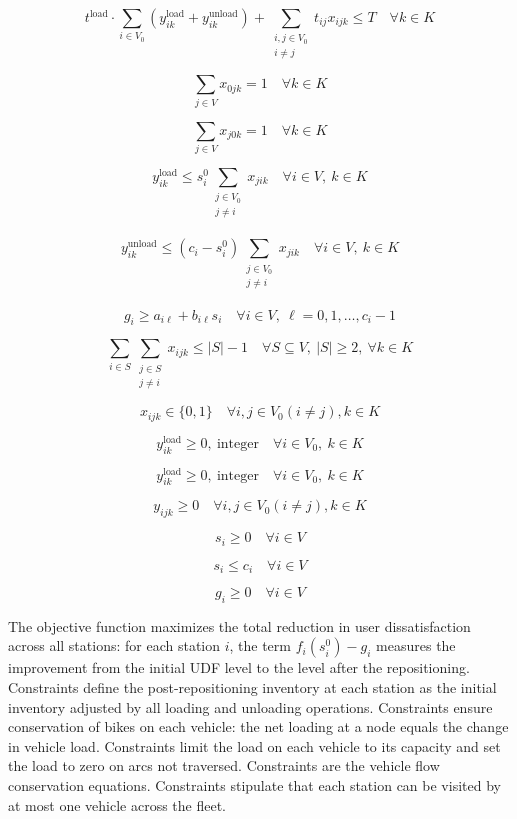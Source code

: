 \documentclass[11pt]{article}
\numberwithin{table}{section}
\numberwithin{figure}{section}
\begin{document}
\[
{{t}^{\text{load}}}\cdot \sum\limits_{i\in {{V}_{0}}}{(y_{ik}^{\text{load}}+y_{ik}^{\text{unload}})}+\sum\limits_{\begin{smallmatrix}
i,j\in {{V}_{0}} \\
i\ne j
\end{smallmatrix}}{{{t}_{ij}}}{{x}_{ijk}}\le T\quad \forall k\in K
\]

\[
\sum\limits_{j\in V}{{{x}_{0jk}}}=1\quad \forall k\in K
\]

\[
\sum\limits_{j\in V}{{{x}_{j0k}}}=1\quad \forall k\in K
\]

\[
y_{ik}^{\text{load}}\le s_{i}^{0}{{\sum }_{\begin{matrix}
j\in {{V}_{0}}  \\
j\ne i  \\
\end{matrix}}}{{x}_{jik}}\quad \forall i\in V,\ k\in K
\]

\[
y_{ik}^{\text{unload}}\le ({{c}_{i}}-s_{i}^{0}){{\sum }_{\begin{matrix}
j\in {{V}_{0}}  \\
j\ne i  \\
\end{matrix}}}{{x}_{jik}}\quad \forall i\in V,\ k\in K
\]

\[
{{g}_{i}}\ge {{a}_{i\ell }}+{{b}_{i\ell }}{{s}_{i}}\quad \forall i\in V,\ \ell =0,1,\ldots ,{{c}_{i}}-1
\]

\[
\sum\limits_{i\in S}{\sum\limits_{\begin{smallmatrix}
j\in S \\
j\ne i
\end{smallmatrix}}{{{x}_{ijk}}}}\le |S|-1\quad \forall S\subseteq V,\ |S|\ge 2,\ \forall k\in K
\]

\[
{{x}_{ijk}}\in \{0,1\}\quad \forall i,j\in {{V}_{0}}(i\ne j),k\in K
\]

\[
y_{ik}^{\text{load}}\ge 0,\ \text{integer}\quad \forall i\in {{V}_{0}},\ k\in K
\]

\[
y_{ik}^{\text{load}}\ge 0,\ \text{integer}\quad \forall i\in {{V}_{0}},\ k\in K
\]

\[
{{y}_{ijk}}\ge 0\quad \forall i,j\in {{V}_{0}}(i\ne j),k\in K
\]

\[
{{s}_{i}}\ge 0\quad \forall i\in V
\]

\[
{{s}_{i}}\le {{c}_{i}}\quad \forall i\in V
\]

\[
{{g}_{i}}\ge 0\quad \forall i\in V
\]

The objective function  maximizes the total reduction in user dissatisfaction across all stations: for each station $i$, the term $f_i(s_i^0) - g_i$ measures the improvement from the initial UDF level to the level after the repositioning. Constraints  define the post-repositioning inventory at each station as the initial inventory adjusted by all loading and unloading operations. Constraints  ensure conservation of bikes on each vehicle: the net loading at a node equals the change in vehicle load. Constraints  limit the load on each vehicle to its capacity and set the load to zero on arcs not traversed. Constraints  are the vehicle flow conservation equations. Constraints  stipulate that each station can be visited by at most one vehicle across the fleet.
\end{document}
